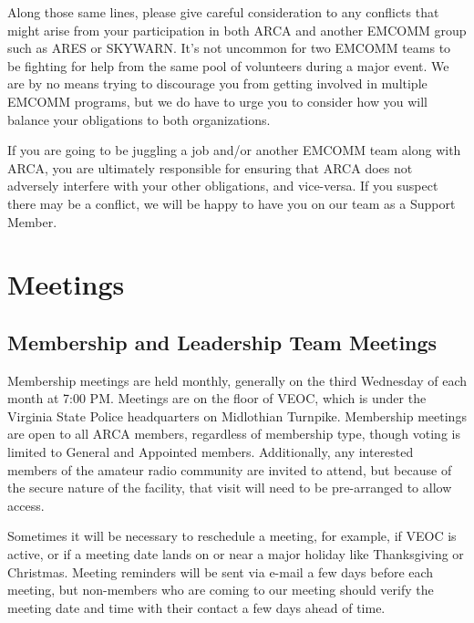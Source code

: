 \documentclass[pdflatex,letterpaper,twoside,12pt]{book}
\begin{document}
Along those same lines, please give careful consideration to any conflicts that might arise from your participation in both ARCA and another EMCOMM group such as ARES or SKYWARN.  It's not uncommon for two EMCOMM teams to be fighting for help from the same pool of volunteers during a major event.  We are by no means trying to discourage you from getting involved in multiple EMCOMM programs, but we do have to urge you to consider how you will balance your obligations to both organizations.

If you are going to be juggling a job and/or another EMCOMM team along with ARCA, you are ultimately responsible for ensuring that ARCA does not adversely interfere with your other obligations, and vice-versa.  If you suspect there may be a conflict, we will be happy to have you on our team as a Support Member.


\chapter{Meetings}

\section{Membership and Leadership Team Meetings}

Membership meetings are held monthly, generally on the third Wednesday of each month at 7:00 PM.  Meetings are on the floor of VEOC, which is under the Virginia State Police headquarters on Midlothian Turnpike.  Membership meetings are open to all ARCA members, regardless of membership type, though voting is limited to General and Appointed members.  Additionally, any interested members of the amateur radio community are invited to attend, but because of the secure nature of the facility, that visit will need to be pre-arranged to allow access.

Sometimes it will be necessary to reschedule a meeting, for example, if VEOC is active, or if a meeting date lands on or near a major holiday like Thanksgiving or Christmas.  Meeting reminders will be sent via e-mail a few days before each meeting, but non-members who are coming to our meeting should verify the meeting date and time with their contact a few days ahead of time.
\end{document}
